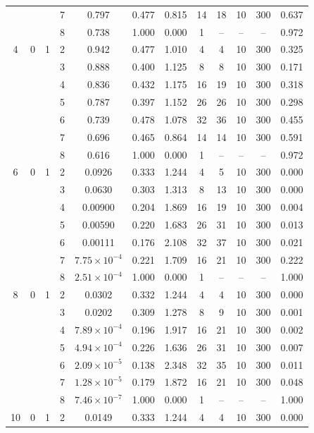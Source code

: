 \documentclass[12pt]{article}
\begin{document}
\begin{table}
\begin{ruledtabular}
\begin{tabular}{cccccccccccc}
 & &  & 7 & 0.797 & 0.477 & 0.815 & 14 & 18 & 10 & 300 & 0.637 \\
 & &  & 8 & 0.738 & 1.000 & 0.000 & 1 & -- & -- & -- & 0.972 \\
\hline
4 & 0 & 1 & 2 & 0.942 & 0.477 & 1.010 & 4 & 4 & 10 & 300 & 0.325 \\
 & &  & 3 & 0.888 & 0.400 & 1.125 & 8 & 8 & 10 & 300 & 0.171 \\
 & &  & 4 & 0.836 & 0.432 & 1.175 & 16 & 19 & 10 & 300 & 0.318 \\
 & &  & 5 & 0.787 & 0.397 & 1.152 & 26 & 26 & 10 & 300 & 0.298 \\
 & &  & 6 & 0.739 & 0.478 & 1.078 & 32 & 36 & 10 & 300 & 0.455 \\
 & &  & 7 & 0.696 & 0.465 & 0.864 & 14 & 14 & 10 & 300 & 0.591 \\
 & &  & 8 & 0.616 & 1.000 & 0.000 & 1 & -- & -- & -- & 0.972 \\
\hline
6 & 0 & 1 & 2 & 0.0926 & 0.333 & 1.244 & 4 & 5 & 10 & 300 & 0.000 \\
 & &  & 3 & 0.0630 & 0.303 & 1.313 & 8 & 13 & 10 & 300 & 0.000 \\
 & &  & 4 & 0.00900 & 0.204 & 1.869 & 16 & 19 & 10 & 300 & 0.004 \\
 & &  & 5 & 0.00590 & 0.220 & 1.683 & 26 & 31 & 10 & 300 & 0.013 \\
 & &  & 6 & 0.00111 & 0.176 & 2.108 & 32 & 37 & 10 & 300 & 0.021 \\
 & &  & 7 & $7.75\times10^{-4}$ & 0.221 & 1.709 & 16 & 21 & 10 & 300 & 0.222 \\
 & &  & 8 & $2.51\times10^{-4}$ & 1.000 & 0.000 & 1 & -- & -- & -- & 1.000 \\
\hline
8 & 0 & 1 & 2 & 0.0302 & 0.332 & 1.244 & 4 & 4 & 10 & 300 & 0.000 \\
 & &  & 3 & 0.0202 & 0.309 & 1.278 & 8 & 9 & 10 & 300 & 0.001 \\
 & &  & 4 & $7.89\times10^{-4}$ & 0.196 & 1.917 & 16 & 21 & 10 & 300 & 0.002 \\
 & &  & 5 & $4.94\times10^{-4}$ & 0.226 & 1.636 & 26 & 31 & 10 & 300 & 0.007 \\
 & &  & 6 & $2.09\times10^{-5}$ & 0.138 & 2.348 & 32 & 35 & 10 & 300 & 0.011 \\
 & &  & 7 & $1.28\times10^{-5}$ & 0.179 & 1.872 & 16 & 21 & 10 & 300 & 0.048 \\
 & &  & 8 & $7.46\times10^{-7}$ & 1.000 & 0.000 & 1 & -- & -- & -- & 1.000 \\
\hline
10 & 0 & 1 & 2 & 0.0149 & 0.333 & 1.244 & 4 & 4 & 10 & 300 & 0.000 \\

\end{tabular}
\end{ruledtabular}
\end{table}
\end{document}
